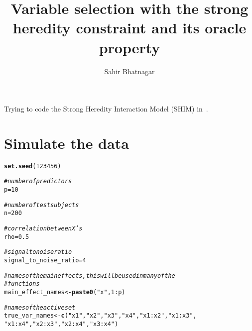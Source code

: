 \documentclass[11pt,letter]{article}\usepackage[]{graphicx}\usepackage[]{color}
\makeatletter
\newcommand{\hlnum}[1]{\textcolor[rgb]{0.686,0.059,0.569}{#1}}%
\newcommand{\hlstr}[1]{\textcolor[rgb]{0.192,0.494,0.8}{#1}}%
\newcommand{\hlcom}[1]{\textcolor[rgb]{0.678,0.584,0.686}{\textit{#1}}}%
\newcommand{\hlopt}[1]{\textcolor[rgb]{0,0,0}{#1}}%
\newcommand{\hlstd}[1]{\textcolor[rgb]{0.345,0.345,0.345}{#1}}%
\newcommand{\hlkwb}[1]{\textcolor[rgb]{0.69,0.353,0.396}{#1}}%
\newcommand{\hlkwd}[1]{\textcolor[rgb]{0.737,0.353,0.396}{\textbf{#1}}}%
\newenvironment{kframe}{%
 \def\at@end@of@kframe{}%
 \ifinner\ifhmode%
  \def\at@end@of@kframe{\end{minipage}}%
  \begin{minipage}{\columnwidth}%
 \fi\fi%
 \def\FrameCommand##1{\hskip\@totalleftmargin \hskip-\fboxsep
 \colorbox{shadecolor}{##1}\hskip-\fboxsep
     \hskip-\linewidth \hskip-\@totalleftmargin \hskip\columnwidth}%
 \MakeFramed {\advance\hsize-\width
   \@totalleftmargin\z@ \linewidth\hsize
   \@setminipage}}%
 {\par\unskip\endMakeFramed%
 \at@end@of@kframe}
\newenvironment{knitrout}{}{} %
\makeatother
\begin{document}
\pagestyle{fancy}

\title{Variable selection with the strong heredity constraint and its oracle property}
\author{Sahir Bhatnagar}
\maketitle






Trying to code the Strong Heredity Interaction Model (SHIM) in~\cite{choi2010variable}.

\section{Simulate the data}

\begin{knitrout}
\color{fgcolor}\begin{kframe}
\begin{alltt}
\hlkwd{set.seed}\hlstd{(}\hlnum{123456}\hlstd{)}

\hlcom{# number of predictors}
\hlstd{p} \hlkwb{=} \hlnum{10}

\hlcom{# number of test subjects}
\hlstd{n} \hlkwb{=} \hlnum{200}

\hlcom{# correlation between X's}
\hlstd{rho} \hlkwb{=} \hlnum{0.5}

\hlcom{# signal to noise ratio}
\hlstd{signal_to_noise_ratio} \hlkwb{=} \hlnum{4}

\hlcom{# names of the main effects, this will be used in many of the}
\hlcom{# functions}
\hlstd{main_effect_names} \hlkwb{<-} \hlkwd{paste0}\hlstd{(}\hlstr{"x"}\hlstd{,} \hlnum{1}\hlopt{:}\hlstd{p)}

\hlcom{# names of the active set}
\hlstd{true_var_names} \hlkwb{<-} \hlkwd{c}\hlstd{(}\hlstr{"x1"}\hlstd{,} \hlstr{"x2"}\hlstd{,} \hlstr{"x3"}\hlstd{,} \hlstr{"x4"}\hlstd{,} \hlstr{"x1:x2"}\hlstd{,} \hlstr{"x1:x3"}\hlstd{,}
    \hlstr{"x1:x4"}\hlstd{,} \hlstr{"x2:x3"}\hlstd{,} \hlstr{"x2:x4"}\hlstd{,} \hlstr{"x3:x4"}\hlstd{)}


\end{alltt}
\end{kframe}
\end{knitrout}
\end{document}
